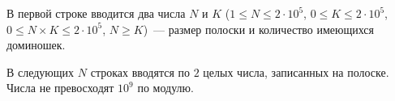 В первой строке вводится два числа $N$ и $K$ ($1 \leq N \leq 2\cdot 10^5$, $0 \leq K \leq 2\cdot 10^5$, $0 \leq N \times K \leq 2\cdot 10^5$, $N \geq K$)~--- размер полоски и количество имеющихся доминошек.

В следующих $N$ строках вводятся по $2$ целых числа, записанных на полоске. Числа не превосходят $10^9$ по модулю.
